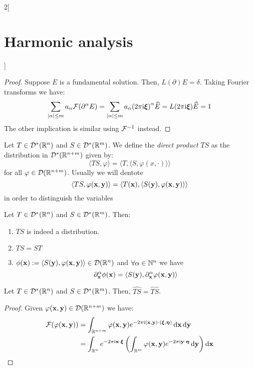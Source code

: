 \documentclass[../../../main_math.tex]{subfiles}
\begin{document}
\begin{multicols}{2}[\section{Harmonic analysis}]
\begin{theorem}
  \end{theorem}
  \begin{proof}
    Suppose $E$ is a fundamental solution. Then, $L(\partial)E=\delta$. Taking Fourier transforms we have:
    $$
      \sum_{\abs{\alpha}\leq m}a_\alpha\mathcal{F}{(\partial^\alpha E)}=\sum_{\abs{\alpha}\leq m}a_\alpha{(2\pi\mathrm{i}\boldsymbol{\mathrm{\xi}})}^\alpha\widehat{E}=L(2\pi\mathrm{i}\boldsymbol{\mathrm{\xi}})\widehat{E}=1
    $$
    The other implication is similar using $\mathcal{F}^{-1}$ instead.
  \end{proof}
  \begin{definition}
    Let $T\in \mathcal{D}^*(\mathbb{R}^n)$ and $S\in \mathcal{D}^*(\mathbb{R}^m)$. We define the \emph{direct product} $TS$ as the distribution in $\mathcal{D}^*(\mathbb{R}^{n+m})$ given by:
    $$
      \langle TS,\varphi\rangle=\langle T,\langle S ,\varphi(x,\cdot)\rangle\rangle
    $$
    for all $\varphi\in \mathcal{D}(\mathbb{R}^{n+m})$. Usually we will dentote
    $$\langle TS,\varphi(\boldsymbol{\mathrm{x}},\boldsymbol{\mathrm{y}})\rangle=\langle T(\boldsymbol{\mathrm{x}}),\langle S(\boldsymbol{\mathrm{y}}) ,\varphi(\boldsymbol{\mathrm{x}},\boldsymbol{\mathrm{y}})\rangle\rangle$$
    in order to distinguish the variables
  \end{definition}
  \begin{lemma}
    Let $T\in \mathcal{D}^*(\mathbb{R}^n)$ and $S\in \mathcal{D}^*(\mathbb{R}^m)$. Then:
    \begin{enumerate}
      \item $TS$ is indeed a distribution.
      \item $TS=ST$
      \item $\phi(\boldsymbol{\mathrm{x}}):=\langle S(\boldsymbol{\mathrm{y}}), \varphi(\boldsymbol{\mathrm{x}},\boldsymbol{\mathrm{y}})\rangle\in \mathcal{D}(\mathbb{R}^n)$ and $\forall \alpha\in\mathbb{N}^n$ we have $$\partial_{\boldsymbol{\mathrm{x}}}^\alpha\phi(\boldsymbol{\mathrm{x}})=\langle S(\boldsymbol{\mathrm{y}}), \partial_{\boldsymbol{\mathrm{x}}}^\alpha\varphi(\boldsymbol{\mathrm{x}},\boldsymbol{\mathrm{y}})\rangle$$
    \end{enumerate}
  \end{lemma}
  \begin{proposition}
    Let $T\in \mathcal{D}^*(\mathbb{R}^n)$ and $S\in \mathcal{D}^*(\mathbb{R}^m)$. Then, $\widehat{TS}=\widehat{T}\widehat{S}$.
  \end{proposition}
  \begin{proof}
    Given $\varphi(\boldsymbol{\mathrm{x}},\boldsymbol{\mathrm{y}})\in \mathcal{D}(\mathbb{R}^{n+m})$ we have:
    \begin{align*}
      \F(\varphi(\vf{x},\vf{y})) & =\int_{\RR^{n+m}}\varphi(\vf{x},\vf{y})e^{-2\pi\ii(\vf{x},\vf{y})\cdot(\vf{\xi},\vf{\eta})}\dd{\vf{x}}\dd{\vf{y}}                                      \\
                                 & = \int_{\RR^{n}}e^{-2\pi\ii\vf{x}\cdot\vf{\xi}}\left(\int_{\RR^{m}}\varphi(\vf{x},\vf{y})e^{-2\pi\ii\vf{y}\cdot\vf{\eta}}\dd{\vf{y}}\right)\dd{\vf{x}} \\

\end{align*}
\end{proof}
\end{multicols}
\end{document}
